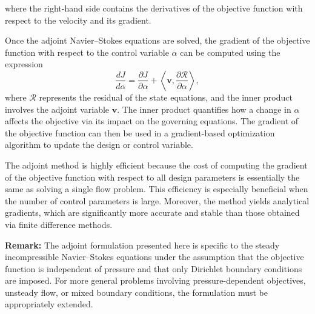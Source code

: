 where the right-hand side contains the derivatives of the objective function with respect to the velocity and its gradient.

Once the adjoint Navier–Stokes equations are solved, the gradient of the objective function with respect to the control variable $\alpha$ can be computed using the expression
\[
\frac{dJ}{d\alpha} = \frac{\partial J}{\partial \alpha} + \left\langle \mathbf{v}, \frac{\partial \mathcal{R}}{\partial \alpha} \right\rangle,
\]
where $\mathcal{R}$ represents the residual of the state equations, and the inner product involves the adjoint variable $\mathbf{v}$. The inner product quantifies how a change in 
$\alpha$ affects the objective via its impact on the governing equations. The gradient of the objective function can then be used in a gradient-based optimization algorithm to update the design or control variable.


The adjoint method is highly efficient because the cost of computing the gradient of the objective function with respect to all design parameters is essentially the same as solving a single flow problem. This efficiency is especially beneficial when the number of control parameters is large. Moreover, the method yields analytical gradients, which are significantly more accurate and stable than those obtained via finite difference methods.

\textbf{Remark:} The adjoint formulation presented here is specific to the steady incompressible Navier–Stokes equations under the assumption that the objective function is independent of pressure and that only Dirichlet boundary conditions are imposed.  For more general problems involving pressure-dependent objectives, unsteady flow, or mixed boundary conditions, the formulation must be appropriately extended.


%

